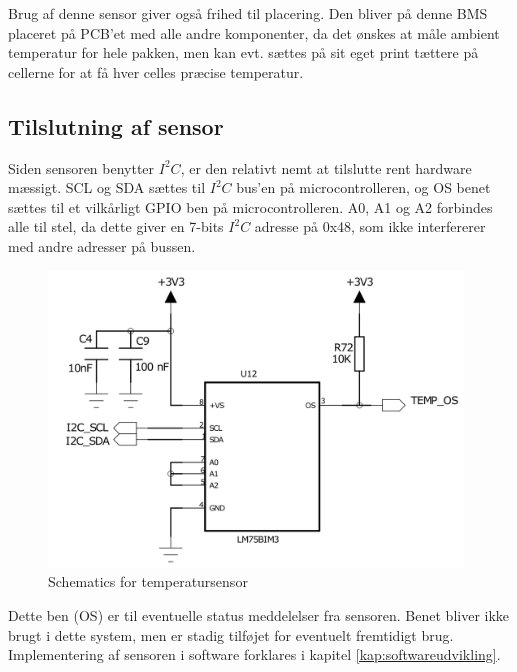 Brug af denne sensor giver også frihed til placering. Den bliver på denne BMS placeret på PCB'et med alle andre komponenter, da det ønskes at måle ambient temperatur for hele pakken, men kan evt. sættes på sit eget print tættere på cellerne for at få hver celles præcise temperatur. 

\subsection{Tilslutning af sensor}
Siden sensoren benytter $I^2C$, er den relativt nemt at tilslutte rent hardware mæssigt. SCL og SDA sættes til $I^2C$ bus'en på microcontrolleren, og OS benet sættes til et vilkårligt GPIO ben på microcontrolleren. A0, A1 og A2 forbindes alle til stel, da dette giver en 7-bits $I^2C$ adresse på 0x48, som ikke interfererer med andre adresser på bussen. \\

\begin{figure}[h]
	\centering
	\includegraphics[width=11cm]{billeder/temp_sensor_sch.png}
	\caption{Schematics for temperatursensor}
	\label{fig:temp_sensor}
\end{figure}

Dette ben (OS) er til eventuelle status meddelelser fra sensoren. Benet bliver ikke brugt i dette system, men er stadig tilføjet for eventuelt fremtidigt brug. Implementering af sensoren i software forklares i kapitel \ref{kap:softwareudvikling}.

